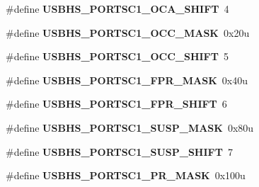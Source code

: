 \begin{DoxyCompactItemize}
\item 
\hypertarget{group___u_s_b_h_s___register___masks_gabf8403cbf82a99d1200b2387b168949c}{}\#define {\bfseries U\+S\+B\+H\+S\+\_\+\+P\+O\+R\+T\+S\+C1\+\_\+\+O\+C\+A\+\_\+\+S\+H\+I\+F\+T}~4\label{group___u_s_b_h_s___register___masks_gabf8403cbf82a99d1200b2387b168949c}

\item 
\hypertarget{group___u_s_b_h_s___register___masks_ga2ddec46bdc935d5735817711d3f80b19}{}\#define {\bfseries U\+S\+B\+H\+S\+\_\+\+P\+O\+R\+T\+S\+C1\+\_\+\+O\+C\+C\+\_\+\+M\+A\+S\+K}~0x20u\label{group___u_s_b_h_s___register___masks_ga2ddec46bdc935d5735817711d3f80b19}

\item 
\hypertarget{group___u_s_b_h_s___register___masks_gab1ad5057d801b0c02c8b82c3604705f3}{}\#define {\bfseries U\+S\+B\+H\+S\+\_\+\+P\+O\+R\+T\+S\+C1\+\_\+\+O\+C\+C\+\_\+\+S\+H\+I\+F\+T}~5\label{group___u_s_b_h_s___register___masks_gab1ad5057d801b0c02c8b82c3604705f3}

\item 
\hypertarget{group___u_s_b_h_s___register___masks_ga1d7d089f985e228dc9404ef6b60a38f0}{}\#define {\bfseries U\+S\+B\+H\+S\+\_\+\+P\+O\+R\+T\+S\+C1\+\_\+\+F\+P\+R\+\_\+\+M\+A\+S\+K}~0x40u\label{group___u_s_b_h_s___register___masks_ga1d7d089f985e228dc9404ef6b60a38f0}

\item 
\hypertarget{group___u_s_b_h_s___register___masks_gaefce9e1987ba80e10904f8d42cc6f7e6}{}\#define {\bfseries U\+S\+B\+H\+S\+\_\+\+P\+O\+R\+T\+S\+C1\+\_\+\+F\+P\+R\+\_\+\+S\+H\+I\+F\+T}~6\label{group___u_s_b_h_s___register___masks_gaefce9e1987ba80e10904f8d42cc6f7e6}

\item 
\hypertarget{group___u_s_b_h_s___register___masks_gad5efadbf1a79e4f6c5c6e15a1aac7770}{}\#define {\bfseries U\+S\+B\+H\+S\+\_\+\+P\+O\+R\+T\+S\+C1\+\_\+\+S\+U\+S\+P\+\_\+\+M\+A\+S\+K}~0x80u\label{group___u_s_b_h_s___register___masks_gad5efadbf1a79e4f6c5c6e15a1aac7770}

\item 
\hypertarget{group___u_s_b_h_s___register___masks_ga2ea22b50dbe2b3e687e413a3ce4992d0}{}\#define {\bfseries U\+S\+B\+H\+S\+\_\+\+P\+O\+R\+T\+S\+C1\+\_\+\+S\+U\+S\+P\+\_\+\+S\+H\+I\+F\+T}~7\label{group___u_s_b_h_s___register___masks_ga2ea22b50dbe2b3e687e413a3ce4992d0}

\item 
\hypertarget{group___u_s_b_h_s___register___masks_ga0931993825659504f3807ed7341279a4}{}\#define {\bfseries U\+S\+B\+H\+S\+\_\+\+P\+O\+R\+T\+S\+C1\+\_\+\+P\+R\+\_\+\+M\+A\+S\+K}~0x100u\label{group___u_s_b_h_s___register___masks_ga0931993825659504f3807ed7341279a4}


\end{DoxyCompactItemize}
